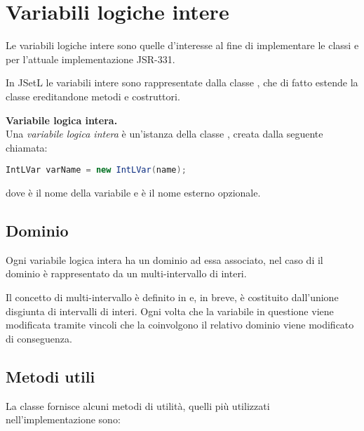 \section{Variabili logiche intere}
Le variabili logiche intere sono quelle d'interesse al fine di implementare le 
classi   e  per l'attuale implementazione JSR-331. 

In JSetL le variabili intere sono rappresentate
dalla classe , che di fatto estende la
classe  ereditandone metodi e costruttori.

\begin{flushleft}\textbf{Variabile logica intera.}\\
Una \emph{variabile logica intera} è un'istanza della classe , 
creata dalla seguente chiamata:
\begin{center}
\lstinline[language = Java]$IntLVar varName = new IntLVar(name);$
\end{center}
dove   è il nome della variabile e  è il nome
esterno opzionale.
\end{flushleft}

\subsection{Dominio}
Ogni variabile logica intera ha un dominio ad essa associato, nel caso di
 il dominio è rappresentato da un multi-intervallo di interi.

Il concetto di multi-intervallo è definito in \cite{tesiAmadini} e, in breve, è
costituito dall'unione disgiunta di intervalli di interi. Ogni volta che
la variabile in questione viene modificata tramite vincoli che la coinvolgono
il relativo dominio viene modificato di conseguenza.

\subsection{Metodi utili}
La classe  fornisce alcuni metodi di utilità, quelli più
utilizzati nell'implementazione sono:

